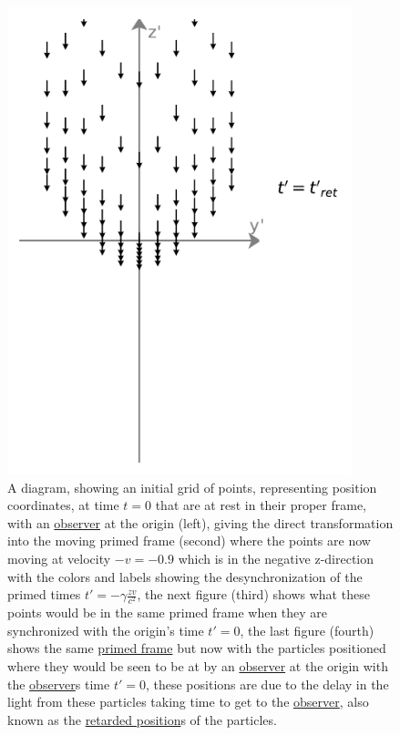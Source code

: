 \begin{figure}[H]
	\centering
	\includegraphics[width = 10cm]{images/pdf/coordinate_transforms_2.pdf}

	\caption{A diagram, showing an initial grid of points, representing position coordinates, at time ${t} = 0$ that are at rest in their proper frame, with an \protect\hyperlink{def-observer}{observer} at the origin (left), giving the direct transformation into the moving primed frame (second) where the points are now moving at velocity $- {v} =-0.9$ which is in the negative z-direction with the colors and labels showing the desynchronization of the primed times ${t{'}} =-{\gamma} \frac{zv}{{c}^2}$, the next figure (third) shows what these points would be in the same primed frame when they are synchronized with the origin's time ${t{'}} = 0$, the last figure (fourth) shows the same \protect\hyperlink{def-Primed-Frame}{primed frame} but now with the particles positioned where they would be seen to be at by an \protect\hyperlink{def-observer}{observer} at the origin with the \protect\hyperlink{def-observer}{observer}s time ${t{'}} = 0$, these positions are due to the delay in the light from these particles taking time to get to the \protect\hyperlink{def-observer}{observer}, also known as the \protect\hyperlink{def-retarded-position}{retarded position}s of the particles.}
	\label{fig: full coordinate transform}
\end{figure}

